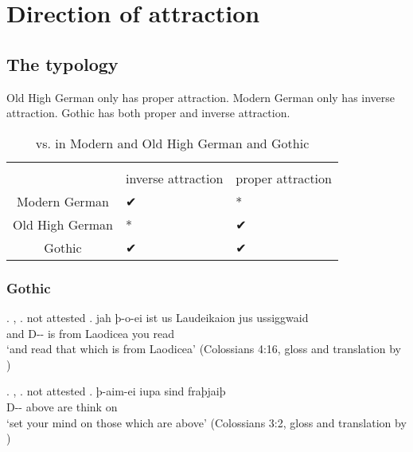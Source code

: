 
\chapter{Direction of attraction}


  \section{The typology}
Old High German only has proper attraction. Modern German only has inverse attraction. Gothic has both proper and inverse attraction.


\begin{table}[h]\label{tbl:intextgoth}
	\center
	\caption { vs.  in Modern and Old High German and Gothic}
	\begin{minipage}{\linewidth}
		\begin{tabularx}{\textwidth}{c *{2}{Y}}
		\toprule
		 								& 				& 				\\
										& inverse attraction	& proper attraction		\\
		\midrule
		Modern German 	& ✔			 							&	*										\\
		Old High German	& *										&	✔										\\
		Gothic					&	✔										&	✔										\\
		\bottomrule
		\end{tabularx}
	\end{minipage}
\end{table}




\subsection{Gothic}

\ex. , 
\a.  not attested
\bg. jah þ-o-ei ist us Laudeikaion jus ussiggwaid\\
 and D-- is\scsub{[nom]} from Laodicea you read\scsub{[acc]}\\
 `and read that which is from Laodicea' \hfill (Colossians 4:16, gloss and translation by \citealt[357]{harbert1978})

\ex. , 
\a.  not attested
\bg. þ-aim-ei iupa sind fraþjaiþ\\
 D-- above are\scsub{[nom]} {think on}\scsub{[dat]}\\
 `set your mind on those which are above' \hfill (Colossians 3:2, gloss and translation by \citealt[339]{harbert1978})

